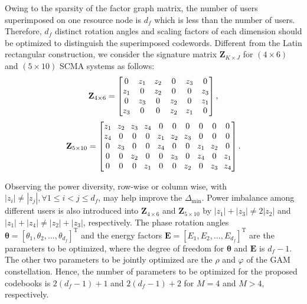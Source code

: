 \documentclass[journal]{IEEEtran}
\begin{document}
Owing  to the sparsity of the factor graph matrix, the number of users superimposed on one resource node is $d_f $ which is less than the number of users. Therefore,  ${{d}_{f}}$ distinct rotation angles and scaling factors   of each dimension should be optimized  to distinguish the superimposed codewords. Different from the Latin rectangular   construction, we consider  the signature matrix  $ {\mathbf{Z}}_{K \times J}$ for $(4 \times 6)$ and $(5 \times 10)$ SCMA systems   \cite{li2020design} as follows: 
 \begin{equation} 
 \small
 \label{signature_46}
 {{\mathbf{Z}}_{4\times 6}}=\left[ \begin{matrix}
   0 & z_1 & z _2 & 0 & z _3 & 0  \\
   z _1 & 0 & z _2 & 0 & 0 & z _3 \\
   0 & z _3& 0 & z _2 & 0 & z _1  \\
   z _3& 0 & 0 & z _2 & z _1 & 0  \\
\end{matrix} \right],
  \end{equation}
\begin{equation}\label{signature_510}
\small
\setlength{\arraycolsep}{3.5pt}
\begin{aligned} 
 {\mathbf {Z}_{5 \times 10}}=\left [{ 
\begin{matrix} 
z _1  & z _2 & z _3& z _4 & 0 & 0 & 0 & 0 & 0 & 0\\ 
z _4 & 0 & 0 & 0 & z _1 & z _2 & z _3& 0 & 0 & 0\\ 
0 & z _3& 0 & 0 & z _4 & 0 & 0 & z _1 & z _2 & 0\\ 
0 & 0 & z _2 & 0 & 0 & z _3& 0 & z _4 & 0 & z _1\\ 
0 & 0 & 0 & z _1 & 0 & 0 & z _2 & 0 & z _3& z _4\\ 
\end{matrix} }\right].\end{aligned}
\end{equation}
 
Observing the power diversity, row-wise or column wise, with $\left | {z_{i}}\right | \ne \left | {{z}_{j}}\right |,\forall 1\le i<j\le {{d}_{f}}$,   may  help   improve the $ {{\Delta}_{\min}}$. Power imbalance among different users is also introduced into  ${{\mathbf{Z}}_{4\times 6}}$ and ${{\mathbf{Z}}_{5\times 10}}$  by $\left | {{z}_{1}}\right | +\left | {{z}_{3}}\right | \ne 2\left | {{z}_{2}}\right | $ and $\left | {{z}_{1}}\right | +\left | {{z}_{4}}\right | \ne \left | {{z}_{2}}\right | +  \left | {{z}_{3}}\right | $, respectively.   
  The phase rotation angles  $\boldsymbol{\theta} ={{\left[  
   {{\theta }_{1}},  {{\theta }_{2}}, \ldots, {{\theta }_{d_{f}}}  \right]}^{\text{T}}}$ and the energy factors  $\mathbf{E} ={{\left[  
   {{E }_{1}},  {{E }_{2}}, \ldots, {{E }_{d_{f}}}  \right]}^{\text{T}}}$ are the parameters to be optimized, where the degree of freedom for $\boldsymbol{\theta}$ and $\mathbf{E}$ is $d_{f} -1$.  The other two parameters to be jointly optimized are the $ \rho$ and $\varphi $ of the GAM constellation.  Hence, the number of   parameters  to be optimized for the  proposed codebooks   is $2 \left (  d_{f} -1  \right ) +1$ and $2 \left (  d_{f} -1  \right ) +2$ for $M=4$ and $M>4$, respectively.
\end{document}

